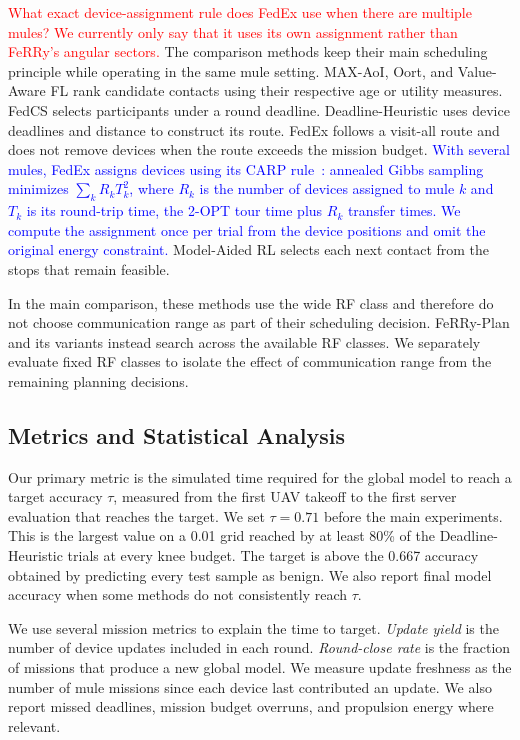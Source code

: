 \documentclass[conference]{IEEEtran}
\newcommand{\sysname}{FeRRy}
\begin{document}
\textcolor{red}{What exact device-assignment rule does FedEx use when there are multiple mules? We currently only say that it uses its own assignment rather than FeRRy's angular sectors.}
The comparison methods keep their main scheduling principle while operating in
the same mule setting. MAX-AoI, Oort, and Value-Aware FL rank candidate
contacts using their respective age or utility measures. FedCS selects
participants under a round deadline. Deadline-Heuristic uses device deadlines
and distance to construct its route. FedEx follows a visit-all route and does
not remove devices when the route exceeds the mission budget. \textcolor{blue}{With several mules, FedEx assigns devices using its CARP rule~\cite{bian2025indirect}:
annealed Gibbs sampling minimizes $\sum_k R_k T_k^2$, where $R_k$ is the number of
devices assigned to mule $k$ and $T_k$ is its round-trip time, the 2-OPT tour time
plus $R_k$ transfer times. We compute the assignment once per trial from the device
positions and omit the original energy constraint.} Model-Aided RL selects each
next contact from the stops that remain feasible.

In the main comparison, these methods use the wide RF class and therefore do
not choose communication range as part of their scheduling decision.
\sysname{}-Plan and its variants instead search across the available RF classes.
We separately evaluate fixed RF classes to isolate the effect of communication
range from the remaining planning decisions.

\subsection{Metrics and Statistical Analysis}
\label{sec:metrics}

Our primary metric is the simulated time required for the global model to reach
a target accuracy \(\tau\), measured from the first UAV takeoff to the first
server evaluation that reaches the target. We set \(\tau=0.71\) before the main
experiments. This is the largest value on a 0.01 grid reached by at least 80\%
of the Deadline-Heuristic trials at every knee budget. The target is above the
0.667 accuracy obtained by predicting every test sample as benign. We also
report final model accuracy when some methods do not consistently reach
\(\tau\).

We use several mission metrics to explain the time to target. \emph{Update
yield} is the number of device updates included in each round.
\emph{Round-close rate} is the fraction of missions that produce a new global
model. We measure update freshness as the number of mule missions since each
device last contributed an update. We also report missed deadlines, mission
budget overruns, and propulsion energy where relevant.
\end{document}

